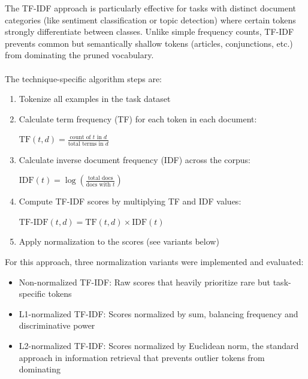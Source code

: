 \documentclass[twocolumn]{article}
\begin{document}
The TF-IDF approach is particularly effective for tasks with distinct document categories (like sentiment classification or topic detection) where certain tokens strongly differentiate between classes. Unlike simple frequency counts, TF-IDF prevents common but semantically shallow tokens (articles, conjunctions, etc.) from dominating the pruned vocabulary.
\\ \\
The technique-specific algorithm steps are:
\begin{enumerate}
    \item Tokenize all examples in the task dataset
    \item Calculate term frequency (TF) for each token in each document:
        \begin{center}
        $\text{TF}(t,d) = \frac{\text{count of $t$ in $d$}}{\text{total terms in $d$}}$
        \end{center}
    \item Calculate inverse document frequency (IDF) across the corpus:
        \begin{center}
        $\text{IDF}(t) = \log\left(\frac{\text{total docs}}{\text{docs with $t$}}\right)$
        \end{center}
    \item Compute TF-IDF scores by multiplying TF and IDF values:
        \begin{center}
        $\text{TF-IDF}(t,d) = \text{TF}(t,d) \times \text{IDF}(t)$
        \end{center}
    \item Apply normalization to the scores (see variants below)
\end{enumerate}
For this approach, three normalization variants were implemented and evaluated:
\begin{itemize}
    \item Non-normalized TF-IDF: Raw scores that heavily prioritize rare but task-specific tokens
    \item L1-normalized TF-IDF: Scores normalized by sum, balancing frequency and discriminative power
    \item L2-normalized TF-IDF: Scores normalized by Euclidean norm, the standard approach in information retrieval that prevents outlier tokens from dominating
\end{itemize}
\end{document}
